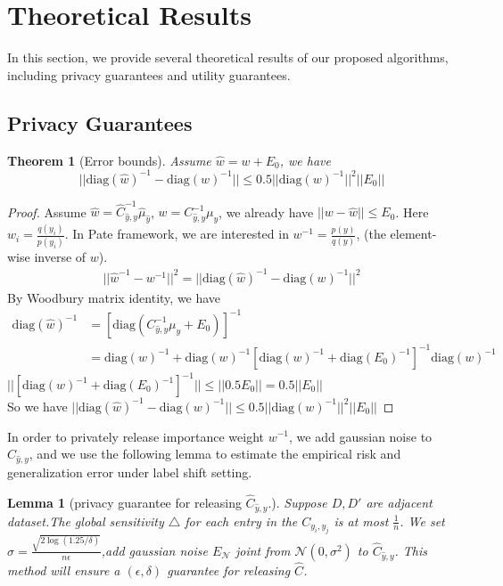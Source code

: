 \documentclass{article}
\def\diag{\mathrm{diag}}
\def\cN{\mathcal{N}}
\newtheorem{lemma}{Lemma}
\newtheorem{theorem}{Theorem}
\theoremstyle{definition}
\begin{document}
\section{Theoretical Results}
In this section, we provide several theoretical results of our proposed algorithms, including privacy guarantees and utility guarantees.

\subsection{Privacy Guarantees}
\begin{theorem}[Error bounds]
	Assume $\hat{w} = w + E_0$, we have 
	$$
	||	\diag(\hat{w})^{-1} -  \diag(w)^{-1}|| \leq 0.5|| \diag(w)^{-1}||^2 ||E_0||
	$$
\end{theorem}
\begin{proof}
	Assume $\hat w  = \hat C_{\hat y, y}^{-1}\hat{\mu}_{\hat y} $, $w = C_{\hat y, y}^{-1} \mu_{y}$, we already have $||w - \hat w|| \leq E_0$. Here $w_i = \frac{q(y_i)}{p(y_i)}$. In Pate framework, we are interested in $ w^{-1} = \frac{p(y)}{q(y)}$, (the element-wise inverse of $w$).
	\begin{align}
	|| \hat w^{-1} -w^{-1}||^2 = || {\diag (\hat w)}^{-1} - {\diag( w)}^{-1}||^2
	\end{align}
	By Woodbury matrix identity, we have 
	\begin{align}
	\diag(\hat{w})^{-1} &= [\diag(C_{\hat y, y}^{-1}\mu_{y} + E_0)]^{-1} \\
	&= \diag(w)^{-1} + \diag(w)^{-1}[\diag(w)^{-1} + \diag(E_0)^{-1}]^{-1}\diag(w)^{-1}
	\end{align}
	$||[\diag(w)^{-1} + \diag(E_0)^{-1}]^{-1}|| \leq||0.5E_0|| =0.5||E_0||$\\
	So we have $||	\diag(\hat{w})^{-1} -  \diag(w)^{-1}|| \leq 0.5|| \diag(w)^{-1}||^2 ||E_0||$
\end{proof}
In order to privately release importance weight $w^{-1}$, we add gaussian noise to $\hat{C}_{\hat y, y}$, and we use the following lemma to estimate the empirical risk and generalization error under label shift setting.
\begin{lemma}[privacy guarantee for releasing $\hat C_{\hat y, y}$.]
	Suppose $D,D'$ are adjacent dataset.The global sensitivity $\triangle$ for each entry in the $C_{y_i, y_j}$ is at most $\frac{1}{n}$. We set $\sigma = \frac{\sqrt{2 \log(1.25/\delta)}}{n \epsilon}$,add gaussian noise $E_{\cN} $ joint from $\cN(0, \sigma^2)$ to
	$\hat C_{\hat y, y}$.  This method will ensure a $(\epsilon, \delta)$ guarantee for releasing $\hat C$.
\end{lemma}\label{privacy_label}
\end{document}
